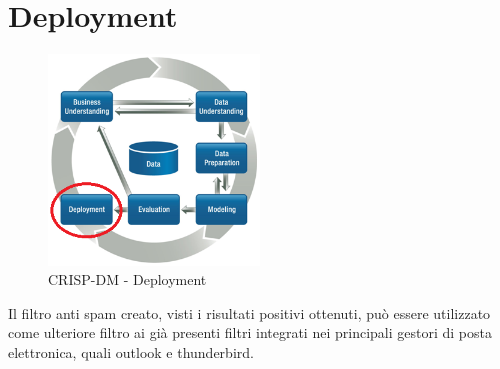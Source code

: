 \chapter{Deployment}

\begin{figure}[hbtp]
	\centering
	\includegraphics[width=0.5\textwidth]{./images/CRISPDM_6.png}
	\caption{CRISP-DM - Deployment}
	\label{CRISPDM_6}
\end{figure}

Il filtro anti spam creato, visti i risultati positivi ottenuti, può essere utilizzato come ulteriore filtro ai già presenti filtri integrati nei principali gestori di posta elettronica, quali outlook e thunderbird.